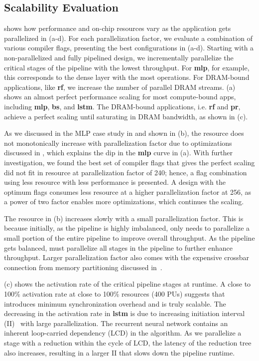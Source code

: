 \subsection{Scalability Evaluation}
 shows how performance and on-chip resources vary as the application gets parallelized in
(a-d). 
For each parallelization factor, we evaluate a combination of various compiler flags, presenting the
best configurations in (a-d).
Starting with a non-parallelized and fully pipelined design, 
we incrementally parallelize the critical stages of the pipeline with the lowest throughput.
For \textbf{mlp}, for example, this corresponds to the dense layer with the most operations.
For DRAM-bound applications, like \textbf{rf}, we increase the number of parallel DRAM streams.
 (a) shows an almost perfect performance scaling for most compute-bound apps, including
\textbf{mlp}, \textbf{bs}, and \textbf{lstm}.
The DRAM-bound applications, i.e. \textbf{rf} and \textbf{pr}, achieve a perfect scaling until
saturating in DRAM bandwidth, as shown in (c).

As we discussed in the MLP case study in  and shown in (b), the resource does not
monotonically increase with parallelization factor due to optimizations discussed in ,
which explains the dip in the \textbf{mlp} curve in (a). 
With further investigation, we found the best set of compiler flags that gives the perfect scaling 
did not fit in resource at parallelization factor of 240; hence, a flag combination using less
resource with less performance is presented. 
A design with the optimum flags consumes less resource at a higher parallelization factor at 256, 
as a power of two factor enables more optimizations, which continues the scaling.

The resource in (b) increases slowly with a small parallelization factor. This is because initially,
as the pipeline is highly imbalanced, \name only needs to parallelize a small portion of the
entire pipeline to improve overall throughput. As the pipeline gets balanced, \name must parallelize
all stages in the pipeline to further enhance throughput. Larger parallelization factor also comes
with the expensive crossbar connection from memory partitioning discussed in~.

 (c) shows the activation rate of the critical pipeline stages at runtime.
A close to 100\% activation rate at close to 100\% resources (400 PUs) suggests that 
\name introduces minimum synchronization overhead and is truly scalable.
The decreasing in the activation rate in \textbf{lstm} is due to increasing initiation interval
(II)~\cite{II} with large parallelization.
The recurrent neural network contains an inherent loop-carried dependency (LCD) in the algorithm. 
As we parallelize a stage with a reduction within the cycle of LCD, the latency of the reduction tree
also increases, resulting in a larger II that slows down the pipeline runtime.

